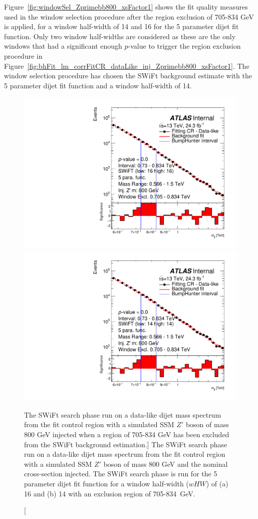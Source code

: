 Figure~\ref{fig:windowSel_Zprimebb800_xsFactor1} shows the fit quality measures used in the window selection procedure after the region exclusion of 705-834 GeV is applied,
for a window half-width of 14 and 16 for the 5 parameter dijet fit function.
Only two window half-widths are considered as these are the only windows that had a significant enough $p$-value to trigger the region exclusion procedure in
Figure~\ref{fig:bhFit_lm_corrFitCR_dataLike_inj_Zprimebb800_xsFactor1}.
The window selection procedure has chosen the SWiFt background estimate with the 5 parameter dijet fit function and a window half-width of 14.


\begin{figure}[!tb]
\captionsetup[subfigure]{aboveskip=0pt,justification=centering}
\centering
{} {
  \includegraphics[width=0.45\linewidth, angle=0]{figs/Dibjet/LowMass/FitStudy_min566/bhFit_corrFitCR_dataLike_5para_low16_high16_inj_Zprimebb800_xsFactor1_removedWindow.pdf}
}
 {
  \includegraphics[width=0.45\linewidth, angle=0]{figs/Dibjet/LowMass/FitStudy_min566/bhFit_corrFitCR_dataLike_5para_low14_high14_inj_Zprimebb800_xsFactor1_removedWindow.pdf}
}

\caption
    [The SWiFt search phase run on a data-like dijet mass spectrum
      from the fit control region with a simulated SSM $Z'$ boson of mass 800 GeV injected when a region of 705-834 GeV has been excluded from the SWiFt background estimation.]
    {\label{fig:bhFit_lm_corrFitCR_dataLike_inj_Zprimebb800_xsFactor1_removedWindow}
      The SWiFt search phase run on a data-like dijet mass spectrum
      from the fit control region with a simulated SSM $Z'$ boson of mass 800 GeV and the nominal cross-section injected.
      The SWiFt search phase is run for the 5 parameter dijet fit function for a window half-width ($wHW$) of (a) 16 and (b) 14
      with an exclusion region of 705-834~GeV.}
\end{figure}
